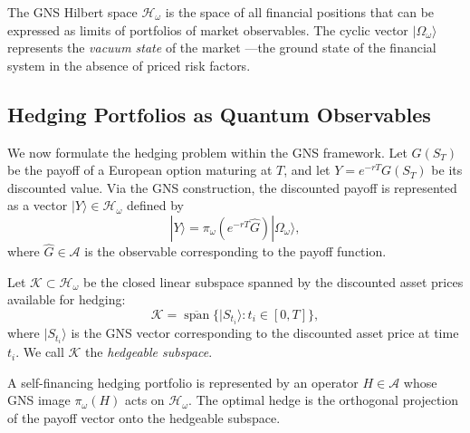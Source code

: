 The GNS Hilbert space $\mathcal{H}_\omega$ is the space of all financial positions
that can be expressed as limits of portfolios of market observables. The cyclic
vector $|\Omega_\omega\rangle$ represents the \emph{vacuum state} of the market
---the ground state of the financial system in the absence of priced risk factors.

\subsection{Hedging Portfolios as Quantum Observables}

We now formulate the hedging problem within the GNS framework. Let $G(S_T)$ be the
payoff of a European option maturing at $T$, and let $Y = e^{-rT} G(S_T)$ be its
discounted value. Via the GNS construction, the discounted payoff is represented as
a vector $|Y\rangle \in \mathcal{H}_\omega$ defined by
\begin{equation*}
    |Y\rangle = \pi_\omega(e^{-rT} \hat{G}) |\Omega_\omega\rangle,
\end{equation*}
where $\hat{G} \in \mathcal{A}$ is the observable corresponding to the payoff
function.

\begin{definition}\label{def:hedgeable-subspace}
Let $\mathcal{K} \subset \mathcal{H}_\omega$ be the closed linear subspace spanned
by the discounted asset prices available for hedging:
\begin{equation*}
    \mathcal{K} = \overline{\operatorname{span}}
        \{|S_{t_i}\rangle : t_i \in [0, T]\},
\end{equation*}
where $|S_{t_i}\rangle$ is the GNS vector corresponding to the discounted asset
price at time $t_i$. We call $\mathcal{K}$ the \emph{hedgeable subspace}.
\end{definition}

A self-financing hedging portfolio is represented by an operator $H \in \mathcal{A}$
whose GNS image $\pi_\omega(H)$ acts on $\mathcal{H}_\omega$. The optimal hedge is
the orthogonal projection of the payoff vector onto the hedgeable subspace.

